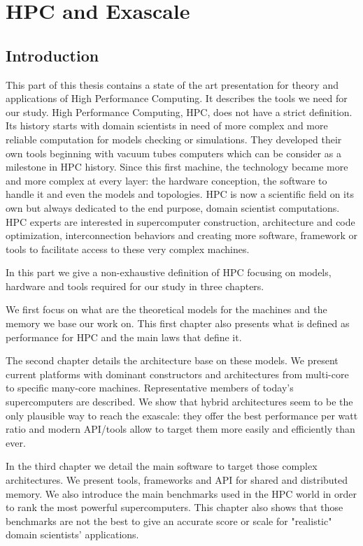 \part{HPC and Exascale}
\chapter*{Introduction}

This part of this thesis contains a state of the art presentation for theory and applications of High Performance Computing.
It describes the tools we need for our study. 
High Performance Computing, HPC, does not have a strict definition. 
Its history starts with domain scientists in need of more complex and more reliable computation for models checking or simulations. 
They developed their own tools beginning  with vacuum tubes computers which can be consider as a milestone in HPC history. 
Since this first machine, the technology became more and more complex at every layer: the hardware conception, the software to handle it and even the models and topologies.
HPC is now a scientific field on its own but always dedicated to the end purpose, domain scientist computations. 
HPC experts are interested in supercomputer construction, architecture and code optimization, interconnection behaviors and creating more software, framework or tools to facilitate access to these very complex machines. 

In this part we give a non-exhaustive definition of HPC focusing on models, hardware and tools required for our study in three chapters.

We first focus on what are the theoretical models for the machines and the memory we base our work on. 
This first chapter also presents what is defined as performance for HPC and the main laws that define it. 

The second chapter details the architecture base on these models. 
We present current platforms with dominant constructors and architectures from multi-core to specific many-core machines. 
Representative members of today's supercomputers are described.  
We show that hybrid architectures seem to be the only plausible way to reach the exascale: they offer the best performance per watt ratio and modern API/tools allow to target them more easily and efficiently than ever.  

In the third chapter we detail the main software to target those complex architectures. 
We present tools, frameworks and API for shared and distributed memory. 
We also introduce the main benchmarks used in the HPC world in order to rank the most powerful supercomputers. 
This chapter also shows that those benchmarks are not the best to give an accurate score or scale for "realistic" domain scientists' applications.

